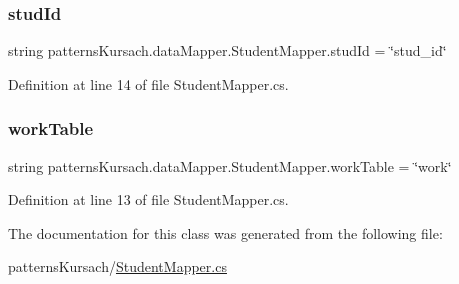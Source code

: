 \subsubsection{\texorpdfstring{stud\+Id}{studId}}
{\footnotesize\ttfamily string patterns\+Kursach.\+data\+Mapper.\+Student\+Mapper.\+stud\+Id = \char`\"{}stud\+\_\+id\char`\"{}\hspace{0.3cm}{\ttfamily [static]}}



Definition at line 14 of file Student\+Mapper.\+cs.

\mbox{\label{classpatterns_kursach_1_1data_mapper_1_1_student_mapper_a3573887067377c52a2968aacef8c5b40}} 
\subsubsection{\texorpdfstring{work\+Table}{workTable}}
{\footnotesize\ttfamily string patterns\+Kursach.\+data\+Mapper.\+Student\+Mapper.\+work\+Table = \char`\"{}work\char`\"{}\hspace{0.3cm}{\ttfamily [static]}}



Definition at line 13 of file Student\+Mapper.\+cs.



The documentation for this class was generated from the following file\+:\begin{DoxyCompactItemize}
\item 
patterns\+Kursach/\mbox{\hyperlink{_student_mapper_8cs}{Student\+Mapper.\+cs}}\end{DoxyCompactItemize}
